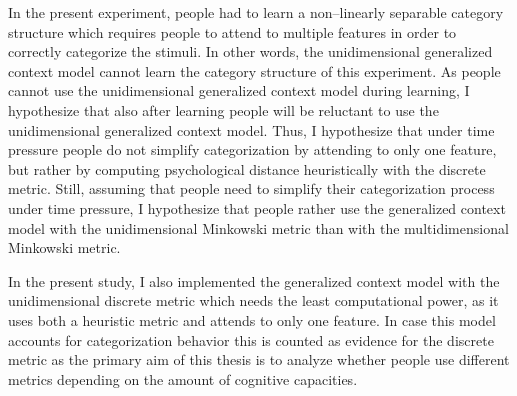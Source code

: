 \documentclass[a4paper,man,natbib]{apa6}
\begin{document}
In the present experiment, people had to learn a non--linearly separable category structure which requires people to attend to multiple features in order to correctly categorize the stimuli. In other words, the unidimensional generalized context model cannot learn the category structure of this experiment. As people cannot use the unidimensional generalized context model during learning, I hypothesize that also after learning people will be reluctant to use the unidimensional generalized context model. Thus, I hypothesize that under time pressure people do not simplify categorization by attending to only one feature, but rather by computing psychological distance heuristically with the discrete metric. Still, assuming that people need to simplify their categorization process under time pressure, I hypothesize that people rather use the generalized context model with the unidimensional Minkowski metric than with the multidimensional Minkowski metric. 

In the present study, I also implemented the generalized context model with the unidimensional discrete metric which needs the least computational power, as it uses both a heuristic metric and attends to only one feature. In case this model accounts for categorization behavior this is counted as evidence for the discrete metric as the primary aim of this thesis is to analyze whether people use different metrics depending on the amount of cognitive capacities.
\end{document}
